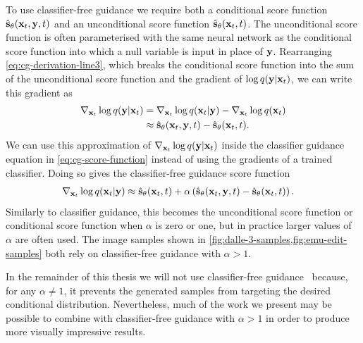To use classifier-free guidance we require both a conditional score function $\hat{{\mathbf{s}}}_\theta({\mathbf{x}}_t, {\mathbf{y}}, t)$ and an unconditional score function $\hat{{\mathbf{s}}}_\theta({\mathbf{x}}_t, t)$. The unconditional score function is often parameterised with the same neural network as the conditional score function into which a null variable is input in place of ${\mathbf{y}}$. Rearranging \cref{eq:cg-derivation-line3}, which breaks the conditional score function into the sum of the unconditional score function and the gradient of $\log q({\mathbf{y}}|{\mathbf{x}}_t)$, we can write this gradient as
\begin{align}
    \nabla_{{\mathbf{x}}_t} \log q({\mathbf{y}}|{\mathbf{x}}_t) &= \nabla_{{\mathbf{x}}_t} \log q({\mathbf{x}}_t|{\mathbf{y}}) - \nabla_{{\mathbf{x}}_t} \log q({\mathbf{x}}_t) \\
    &\approx \hat{{\mathbf{s}}}_\theta({\mathbf{x}}_t, {\mathbf{y}}, t) - \hat{{\mathbf{s}}}_\theta({\mathbf{x}}_t, t).
\end{align}
We can use this approximation of $\nabla_{{\mathbf{x}}_t} \log q({\mathbf{y}}|{\mathbf{x}}_t)$ inside the classifier guidance equation in \cref{eq:cg-score-function} instead of using the gradients of a trained classifier. Doing so gives the classifier-free guidance score function
\begin{align}
    \nabla_{{\mathbf{x}}_t} \log q({\mathbf{x}}_t|{\mathbf{y}}) &\approx \hat{{\mathbf{s}}}_\theta({\mathbf{x}}_t, t) + \alpha \left( \hat{{\mathbf{s}}}_\theta({\mathbf{x}}_t, {\mathbf{y}}, t) - \hat{{\mathbf{s}}}_\theta({\mathbf{x}}_t, t) \right). \label{eq:cfg-score-function}
\end{align}
Similarly to classifier guidance, this becomes the unconditional score function or conditional score function when $\alpha$ is zero or one, but in practice larger values of $\alpha$ are often used. The image samples shown in \cref{fig:dalle-3-samples,fig:emu-edit-samples} both rely on classifier-free guidance with $\alpha > 1$. 

In the remainder of this thesis we will not use classifier-free guidance~\citep{ho2022classifier} because, for any $\alpha \neq 1$, it prevents the generated samples from targeting the desired conditional distribution. Nevertheless, much of the work we present may be possible to combine with classifier-free guidance with $\alpha>1$ in order to produce more visually impressive results.
